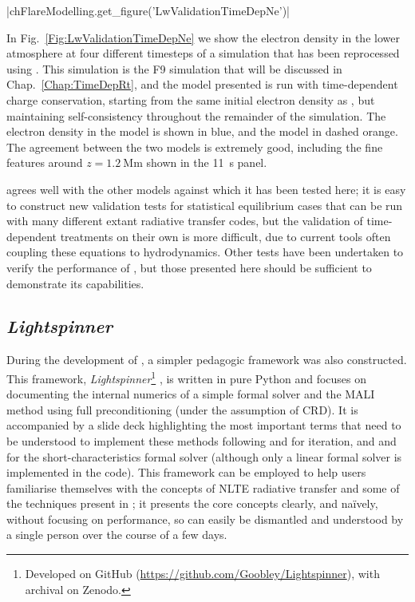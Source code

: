 \py[FlareModelling]|chFlareModelling.get_figure('LwValidationTimeDepNe')|

In Fig.~\ref{Fig:LwValidationTimeDepNe} we show the electron density in the lower atmosphere at four different timesteps of a \Radyn{} simulation that has been reprocessed using \Lw{}.
This simulation is the F9 simulation that will be discussed in Chap.~\ref{Chap:TimeDepRt}, and the \Lw{} model presented is run with time-dependent charge conservation, starting from the same initial electron density as \Radyn{}, but maintaining self-consistency throughout the remainder of the simulation.
The electron density in the \Radyn{} model is shown in blue, and the \Lw{} model in dashed orange.
The agreement between the two models is extremely good, including the fine features around $z=\SI{1.2}{\mega\metre}$ shown in the \SI{11}{\second} panel.

\Lw{} agrees well with the other models against which it has been tested here; it is easy to construct new validation tests for statistical equilibrium cases that can be run with many different extant radiative transfer codes, but the validation of time-dependent treatments on their own is more difficult, due to current tools often coupling these equations to hydrodynamics.
Other tests have been undertaken to verify the performance of \Lw{}, but those presented here should be sufficient to demonstrate its capabilities.


\subsection{\emph{Lightspinner}}

During the development of \Lw{}, a simpler pedagogic framework was also constructed.
This framework, \emph{Lightspinner}\footnote{Developed on GitHub (\url{https://github.com/Goobley/Lightspinner}), with archival on Zenodo.} \citep{Lightspinner}, is written in pure Python and focuses on documenting the internal numerics of a simple formal solver and the MALI method using full preconditioning (under the assumption of CRD).
It is accompanied by a slide deck highlighting the most important terms that need to be understood to implement these methods following \citet{Rybicki1992} and \citet{Uitenbroek2001} for iteration, and \citet{Olson1987} and \citet{Auer1994} for the short-characteristics formal solver (although only a linear formal solver is implemented in the code). This framework can be employed to help users familiarise themselves with the concepts of NLTE radiative transfer and some of the techniques present in \Lw{}; it presents the core concepts clearly, and naïvely, without focusing on performance, so can easily be dismantled and understood by a single person over the course of a few days.

